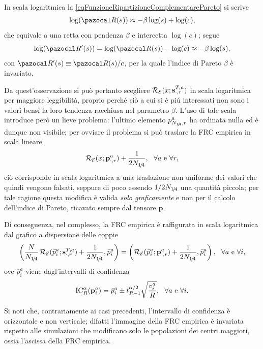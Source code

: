         \begin{oss}
          \label{ossLogaritmooFRCPareto}
          In scala logaritmica la \cref{eqFunzioneRipartizioneComplementarePareto} si scrive
          \[
            \log(\pazocal R(s))\approx-\beta\log(s)+\log(c),
          \]
          che equivale a una retta con pendenza \(\beta\) e intercetta \(\log(c)\); segue
          \[
            \log(\pazocal R'(s))=\log(\pazocal R(s))-\log(c)\approx-\beta\log(s),
          \]
          con \(\pazocal R'(s)\equiv\pazocal R(s)/c\), per la quale l'indice di Pareto \(\beta\) è invariato.
        \end{oss}

        Da quest'osservazione si può pertanto scegliere \(\operatorname{\mathcal R}_{\mathcal E}(x;\mathbf s^{T,a}_{\cdot,r})\) in scala logaritmica per maggiore leggibilità, proprio perché ciò a cui si è piú interessati non sono i valori bensí la loro tendenza racchiusa nel parametro \(\beta\). L'uso di tale scala introduce però un lieve problema: l'ultimo elemento \(p^a_{N_{1\hspace{-0.15em}/\hspace{-0.15em}4},r}\) ha ordinata nulla ed è dunque non visibile; per ovviare il problema si può traslare la FRC empirica in scala lineare
        \begin{equation*}
          \operatorname{\mathcal R}_{\mathcal E}(x;\mathbf p^a_{\cdot,r})+\frac1{2N_{1\hspace{-0.15em}/\hspace{-0.15em}4}},
          \ \ \forall a\text{ e }\forall r,
        \end{equation*}
        ciò corrisponde in scala logaritmica a una traslazione non uniforme dei valori che quindi vengono falsati, seppure di poco essendo \(1/2N_{1\hspace{-0.15em}/\hspace{-0.15em}4}\) una quantità piccola; per tale ragione questa modifica è valida \textit{solo graficamente} e non per il calcolo dell'indice di Pareto, ricavato sempre dal tensore \(\mathbf p\).

        Di conseguenza, nel complesso, la FRC empirica è raffigurata in scala logaritmica dal grafico a dispersione delle coppie
        \begin{equation*}
          \left(
            \frac N{N_{1\hspace{-0.15em}/\hspace{-0.15em}4}}\operatorname{\mathcal R}_{\mathcal E}(\bar p^a_i;\mathbf s^{T,a}_{\cdot,r})
            +\frac1{2N_{1\hspace{-0.15em}/\hspace{-0.15em}4}},\bar p^a_i
          \right)
          =\left(
            \operatorname{\mathcal R}_{\mathcal E}(\bar p^a_i;\mathbf p^a_{\cdot,r})
            +\frac1{2N_{1\hspace{-0.15em}/\hspace{-0.15em}4}},\bar p^a_i
          \right),
          \ \ \forall a\text{ e }\forall i,
        \end{equation*}
        ove \(\bar p^a_i\) viene dagl'intervalli di confidenza
        \begin{equation*}
          \operatorname{IC}_R^{\alpha}(\mathbf p^a_i)=
          \bar p^a_i\pm t^{\alpha/2}_{R-1}\sqrt{\frac{v^a_i}R},
          \ \ \forall a\text{ e }\forall i.
        \end{equation*}
        \begin{oss}
          Si noti che, contrariamente ai casi precedenti, l'intervallo di confidenza è orizzontale e non verticale; difatti l'immagine della FRC empirica è invariata rispetto alle simulazioni che modificano solo le popolazioni dei centri maggiori, ossia l'ascissa della FRC empirica.
        \end{oss}

